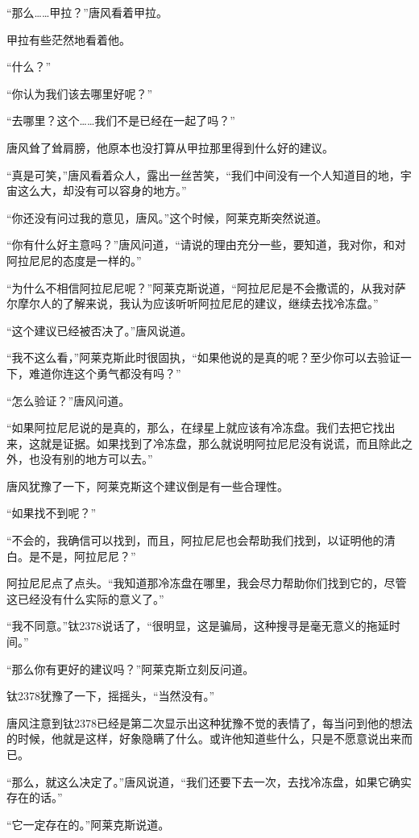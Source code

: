 “那么……甲拉？”唐风看着甲拉。 

甲拉有些茫然地看着他。 

“什么？” 

“你认为我们该去哪里好呢？” 

“去哪里？这个……我们不是已经在一起了吗？” 

唐风耸了耸肩膀，他原本也没打算从甲拉那里得到什么好的建议。 

“真是可笑，”唐风看着众人，露出一丝苦笑，“我们中间没有一个人知道目的地，宇宙这么大，却没有可以容身的地方。” 

“你还没有问过我的意见，唐风。”这个时候，阿莱克斯突然说道。 

“你有什么好主意吗？”唐风问道，“请说的理由充分一些，要知道，我对你，和对阿拉尼尼的态度是一样的。” 

“为什么不相信阿拉尼尼呢？”阿莱克斯说道，“阿拉尼尼是不会撒谎的，从我对萨尔摩尔人的了解来说，我认为应该听听阿拉尼尼的建议，继续去找冷冻盘。” 

“这个建议已经被否决了。”唐风说道。 

“我不这么看，”阿莱克斯此时很固执，“如果他说的是真的呢？至少你可以去验证一下，难道你连这个勇气都没有吗？” 

“怎么验证？”唐风问道。 

“如果阿拉尼尼说的是真的，那么，在绿星上就应该有冷冻盘。我们去把它找出来，这就是证据。如果找到了冷冻盘，那么就说明阿拉尼尼没有说谎，而且除此之外，也没有别的地方可以去。” 

唐风犹豫了一下，阿莱克斯这个建议倒是有一些合理性。 

“如果找不到呢？” 

“不会的，我确信可以找到，而且，阿拉尼尼也会帮助我们找到，以证明他的清白。是不是，阿拉尼尼？” 

阿拉尼尼点了点头。“我知道那冷冻盘在哪里，我会尽力帮助你们找到它的，尽管这已经没有什么实际的意义了。” 

“我不同意。”钛2378说话了，“很明显，这是骗局，这种搜寻是毫无意义的拖延时间。” 

“那么你有更好的建议吗？”阿莱克斯立刻反问道。 

钛2378犹豫了一下，摇摇头，“当然没有。” 

唐风注意到钛2378已经是第二次显示出这种犹豫不觉的表情了，每当问到他的想法的时候，他就是这样，好象隐瞒了什么。或许他知道些什么，只是不愿意说出来而已。 

“那么，就这么决定了。”唐风说道，“我们还要下去一次，去找冷冻盘，如果它确实存在的话。” 

“它一定存在的。”阿莱克斯说道。 

